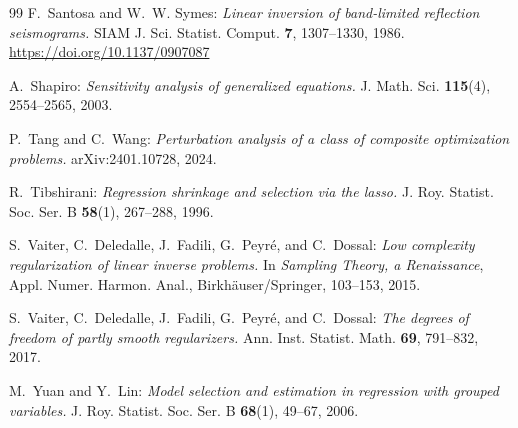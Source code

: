 \documentclass[reqno]{amsart}
\numberwithin{equation}{section}
\begin{document}
\begin{thebibliography}{99}
{\sc F.~Santosa and W.~W. Symes:}
{\em Linear inversion of band-limited reflection seismograms.}
SIAM J. Sci. Statist. Comput. {\bf 7}, 1307--1330, 1986.
\url{https://doi.org/10.1137/0907087}

{\sc A.~Shapiro:}
{\em Sensitivity analysis of generalized equations.}
J. Math. Sci. {\bf 115}(4), 2554--2565, 2003.

{\sc P.~Tang and C.~Wang:}
{\em Perturbation analysis of a class of composite optimization problems.}
arXiv:2401.10728, 2024.

{\sc R.~Tibshirani:}
{\em Regression shrinkage and selection via the lasso.}
J. Roy. Statist. Soc. Ser. B {\bf 58}(1), 267--288, 1996.

{\sc S.~Vaiter, C.~Deledalle, J.~Fadili, G.~Peyr\'e, and C.~Dossal:}
{\em Low complexity regularization of linear inverse problems.}
In {\em Sampling Theory, a Renaissance}, Appl. Numer. Harmon. Anal., Birkh\"auser/Springer, 103--153, 2015.

{\sc S.~Vaiter, C.~Deledalle, J.~Fadili, G.~Peyr\'e, and C.~Dossal:}
{\em The degrees of freedom of partly smooth regularizers.}
Ann. Inst. Statist. Math. {\bf 69}, 791--832, 2017.

{\sc M.~Yuan and Y.~Lin:}
{\em Model selection and estimation in regression with grouped variables.}
J. Roy. Statist. Soc. Ser. B {\bf 68}(1), 49--67, 2006.

\end{thebibliography}










\end{document}
